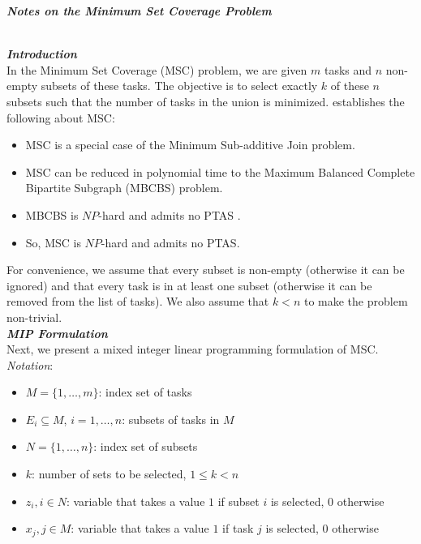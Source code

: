 \documentclass[12pt]{article}
\newcommand{\heading}[1]{\emph{\textbf{\large #1}}}
\newcommand{\subheading}[1]{\emph{\textbf{#1}}}
\begin{document}
\begin{center}
\heading{Notes on the Minimum Set Coverage Problem}\\ \quad \\
\end{center}

\subheading{Introduction}\\

In the Minimum Set Coverage (MSC) problem, we are given $m$ tasks and $n$ non-empty subsets of these tasks. The objective is to select exactly $k$ of these $n$ subsets such that the number of tasks in the union is minimized. \cite{Vinterbo2007} establishes the following about MSC:

\begin{itemize}
\item MSC is a special case of the Minimum Sub-additive Join problem.
\item MSC can be reduced in polynomial time to the Maximum Balanced Complete Bipartite Subgraph (MBCBS) problem.
\item MBCBS is $NP$-hard and admits no PTAS \cite{SubhashKhot2006}.
\item So, MSC is $NP$-hard and admits no PTAS.
\end{itemize}

For convenience, we assume that every subset is non-empty (otherwise it can be ignored) and that every task is in at least one subset (otherwise it can be removed from the list of tasks). We also assume that $k < n$ to make the problem non-trivial.\\

\subheading{MIP Formulation}\\

Next, we present a mixed integer linear programming formulation of MSC.\\

\textit{Notation}:
\begin{itemize}
\item $M = \{1,\ldots,m\}$: index set of tasks
\item $E_i \subseteq M$, $i=1,\ldots,n$: subsets of tasks in $M$
\item $N = \{1,\ldots,n\}$: index set of subsets
\item $k$: number of sets to be selected, $1 \leq k < n$
\item $z_i,i \in N$: variable that takes a value $1$ if subset $i$ is selected, $0$ otherwise
\item $x_j,j \in M$: variable that takes a value $1$ if task $j$ is selected, $0$ otherwise
\end{itemize}
\end{document}
